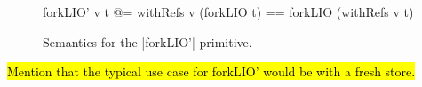 \begin{figure}[ht]
  \centering
\begin{code}
forkLIO' v t  @= withRefs v (forkLIO t) 
              == forkLIO (withRefs v t)
\end{code}

  \caption{Semantics for the |forkLIO'| primitive.}
  \label{fig:forkS-semantics}
\end{figure}

\hl{Mention that the typical use case for forkLIO' would be with a fresh store.}




